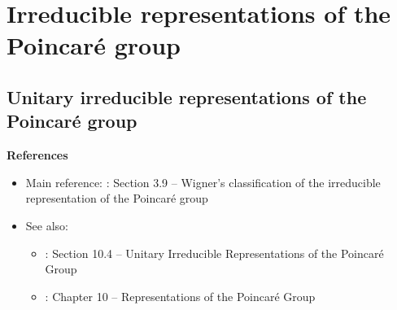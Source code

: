 

\chapter{Irreducible representations of the Poincaré group}
\setcounter{theorem}{0}
\setcounter{equation}{0}


\renewcommand{\theenumi}{\roman{enumi}}
\renewcommand{\labelenumi}{\textnormal{(\theenumi)}$\;\;$}



\vskip 0.5cm

\vskip 0.5cm

\vskip 0.5cm

\vskip 0.5cm

\vskip 0.5cm



\section{Unitary irreducible representations of the Poincaré group}


\noindent
\textbf{References}
\begin{itemize}
\item
	Main reference:
	\vskip 0.1cm
	\cite{Sternberg1994}: Section 3.9 -- Wigner's classification of the irreducible representation of the Poincaré group
\item
	See also:
	\begin{itemize}
	\item
		\cite{Tung1985}: Section 10.4 -- Unitary Irreducible Representations of the Poincaré Group
	\item
		\cite{Jones2020}: Chapter 10 -- Representations of the Poincaré Group
	\end{itemize}
\end{itemize}

